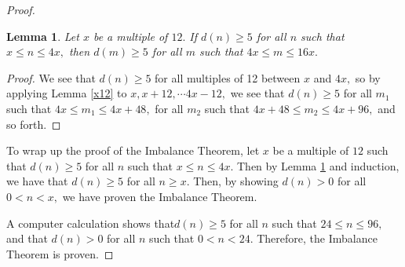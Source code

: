\documentclass{article}
\newtheorem{lemma}{Lemma}[section]
\begin{document}
\begin{proof}
\begin{lemma}
\label{4jump}
Let $x$ be a multiple of $12.$ If $d(n) \geq 5$ for all $n$ such that $x \leq n \leq 4x,$ then $d(m) \geq 5$ for all $m$ such that $4x \leq m \leq 16x.$
\end{lemma}

\begin{proof}
We see that $d(n) \geq 5$ for all multiples of 12 between $x$ and $4x,$ so by applying Lemma \ref{x12} to $x, x+12, \cdots 4x-12,$ we see that $d(n) \geq 5$ for all $m_1$ such that $4x \leq m_1 \leq 4x+48,$ for all $m_2$ such that $4x+48 \leq m_2 \leq 4x+96,$ and so forth.
\end{proof}

To wrap up the proof of the Imbalance Theorem, let $x$ be a multiple of $12$ such that $d(n) \geq 5$ for all $n$ such that $x \leq n \leq 4x.$ Then by Lemma \ref{4jump} and induction, we have that $d(n) \geq 5$ for all $n \geq x.$ Then, by showing $d(n) > 0$ for all $0 < n < x,$ we have proven the Imbalance Theorem.

A computer calculation shows that$d(n) \geq 5$ for all $n$ such that $24 \leq n \leq 96,$ and that $d(n) > 0$ for all $n$ such that $0 < n < 24.$ Therefore, the Imbalance Theorem is proven.
\end{proof}
\end{document}
